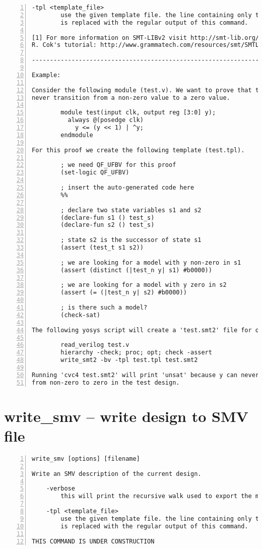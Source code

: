 \begin{lstlisting}[numbers=left,frame=single]
    -tpl <template_file>
        use the given template file. the line containing only the token '%%'
        is replaced with the regular output of this command.

[1] For more information on SMT-LIBv2 visit http://smt-lib.org/ or read David
R. Cok's tutorial: http://www.grammatech.com/resources/smt/SMTLIBTutorial.pdf

---------------------------------------------------------------------------

Example:

Consider the following module (test.v). We want to prove that the output can
never transition from a non-zero value to a zero value.

        module test(input clk, output reg [3:0] y);
          always @(posedge clk)
            y <= (y << 1) | ^y;
        endmodule

For this proof we create the following template (test.tpl).

        ; we need QF_UFBV for this proof
        (set-logic QF_UFBV)

        ; insert the auto-generated code here
        %%

        ; declare two state variables s1 and s2
        (declare-fun s1 () test_s)
        (declare-fun s2 () test_s)

        ; state s2 is the successor of state s1
        (assert (test_t s1 s2))

        ; we are looking for a model with y non-zero in s1
        (assert (distinct (|test_n y| s1) #b0000))

        ; we are looking for a model with y zero in s2
        (assert (= (|test_n y| s2) #b0000))

        ; is there such a model?
        (check-sat)

The following yosys script will create a 'test.smt2' file for our proof:

        read_verilog test.v
        hierarchy -check; proc; opt; check -assert
        write_smt2 -bv -tpl test.tpl test.smt2

Running 'cvc4 test.smt2' will print 'unsat' because y can never transition
from non-zero to zero in the test design.
\end{lstlisting}

\section{write\_smv -- write design to SMV file}
\label{cmd:write_smv}
\begin{lstlisting}[numbers=left,frame=single]
    write_smv [options] [filename]

Write an SMV description of the current design.

    -verbose
        this will print the recursive walk used to export the modules.

    -tpl <template_file>
        use the given template file. the line containing only the token '%%'
        is replaced with the regular output of this command.

THIS COMMAND IS UNDER CONSTRUCTION
\end{lstlisting}

